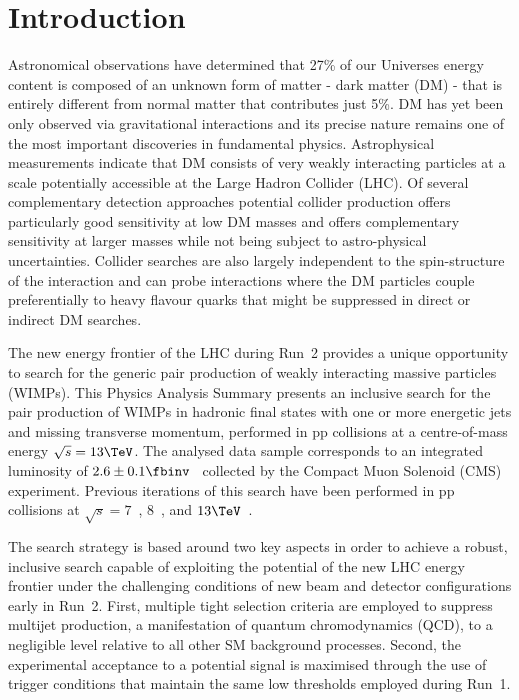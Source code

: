 \section{Introduction}
\label{sec:introduction}

Astronomical observations have determined that 27\% of our Universes
energy content is composed of an unknown form of matter - dark matter
(DM) - that is entirely different from normal matter that contributes
just 5\%. DM has yet been only observed via gravitational interactions
and its precise nature remains one of the most important discoveries
in fundamental physics.  Astrophysical measurements indicate that DM
consists of very weakly interacting particles at a scale potentially
accessible at the Large Hadron Collider (LHC). Of several
complementary detection approaches potential collider production
offers particularly good sensitivity at low DM masses and offers
complementary sensitivity at larger masses while not being subject to
astro-physical uncertainties. Collider searches are also largely
independent to the spin-structure of the interaction and can
probe interactions where the DM particles couple preferentially to heavy flavour quarks that might be suppressed
in direct or indirect DM searches.

The new energy frontier of the LHC during Run~2 provides a unique
opportunity to search for the generic pair production of weakly interacting massive particles (WIMPs). This Physics Analysis Summary presents an inclusive search for the pair production of WIMPs in hadronic final states with one or more energetic jets and
missing transverse momentum, performed in pp collisions at a
centre-of-mass energy $\sqrt{s} = 13\TeV$. The analysed data sample
corresponds to an integrated luminosity of $2.6 \pm 0.1
\fbinv$~\cite{lumi} collected by the Compact Muon Solenoid (CMS)
experiment. Previous iterations of this search have been performed in
pp collisions at $\sqrt{s} = 7$~\cite{RA1Paper, RA1Paper2011,
  RA1Paper2011FULL}, $8$~\cite{RA1Paper2012, RA1Parked}, and
$13\TeV$~\cite{RA1Paper2015}.

The search strategy is based around two key aspects in order to
achieve a robust, inclusive search capable of exploiting the potential
of the new LHC energy frontier under the challenging conditions of new
beam and detector configurations early in Run~2. First, multiple tight
selection criteria are employed to suppress multijet production, a
manifestation of quantum chromodynamics (QCD), to a negligible level
relative to all other SM background processes. Second, the
experimental acceptance to a potential signal is maximised through the
use of trigger conditions that maintain the same low thresholds
employed during Run~1.


